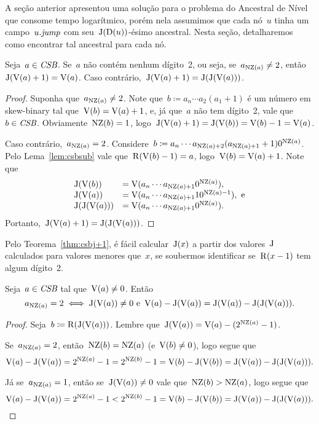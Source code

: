 \documentclass[main.tex]{subfiles}
\begin{document}
A seção anterior apresentou uma solução para o problema do Ancestral de Nível que consome tempo logarítmico, porém nela assumimos que cada nó~$u$ tinha um campo~$u.\jmp$ com seu~\mbox{$\J(\Dep(u))$-ésimo} ancestral. Nesta seção, detalharemos como encontrar tal ancestral para cada nó.

\begin{theorem} \label{thm:csbj+1}
	Seja~$a \in \CSB$. Se~$a$ não contém nenhum dígito~2, ou seja, se~$a_{\NZ(a)} \neq 2$, então~$\J(\V(a) + 1) = \V(a)$. Caso contrário,~$\J(\V(a) + 1) = \J(\J(\V(a)))$.
\end{theorem}
\begin{proof}
	Suponha que~$a_{\NZ(a)} \neq 2$. Note que~$b \coloneqq a_n \cdots a_2 (a_1 + 1)$ é um número em skew-binary tal que~${\V(b) = \V(a) + 1}$, e, já que~$a$ não tem dígito~2, vale que~${b \in \CSB}$. Obviamente~${\NZ(b) = 1}$, logo~${\J(\V(a) + 1) = \J(\V(b)) = \V(b) - 1 = \V(a)}$.

	Caso contrário,~${a_{\NZ(a)} = 2}$. Considere~${b \coloneqq a_n \cdots a_{\NZ(a) + 2} (a_{\NZ(a) + 1} + 1) 0^{\NZ(a)}}$. Pelo Lema~\ref{lem:csbsub} vale que~${\R(\V(b) - 1) = a}$, logo~${\V(b) = \V(a) + 1}$. Note que \vspace{-2ex}
	\[
	\begin{array}{ll}
		\J(\V(b))     &= \V(a_n \cdots a_{\NZ(a) + 1} 0^{\NZ(a)}), \\
		\J(\V(a))     &= \V(a_n \cdots a_{\NZ(a) + 1} 10^{\NZ(a)-1}),\text{ e} \\
		\J(\J(\V(a))) &= \V(a_n \cdots a_{\NZ(a) + 1} 0^{\NZ(a)}). \\
	\end{array}
	\]
	Portanto,~$\J(\V(a) + 1) = \J(\J(\V(a)))$.
\end{proof}

Pelo Teorema~\ref{thm:csbj+1}, é fácil calcular~$\J(x)$ a partir dos valores~$\J$ calculados para valores menores que~$x$, se soubermos identificar se~$\R(x - 1)$ tem algum dígito~2.

\begin{proposition} \label{prop:csbjj}
	Seja~$a \in \CSB$ tal que~$\V(a) \neq 0$. Então \vspace{-2ex}
	$${a_{\NZ(a)} = 2 \iff \J(\V(a)) \neq 0 \text{ e } \V(a) - \J(\V(a)) = \J(\V(a)) - \J(\J(\V(a))).}$$
\end{proposition}
\begin{proof}
	Seja~$b \coloneqq \R(\J(\V(a)))$. Lembre que~${\J(\V(a)) = \V(a) - (2^{\NZ(a)} - 1)}$.

	Se~$a_{\NZ(a)} = 2$, então~$\NZ(b) = \NZ(a)$ (e~$\V(b) \neq 0$), logo segue que~$$\V(a) - \J(\V(a)) = 2^{\NZ(a)} - 1 = 2^{\NZ(b)} - 1 = \V(b) - \J(\V(b)) = \J(\V(a)) - \J(\J(\V(a))).$$

	Já se~$a_{\NZ(a)} = 1$, então se~$\J(\V(a)) \neq 0$ vale que~$\NZ(b) > \NZ(a)$, logo segue que~$$\V(a) - \J(\V(a)) = 2^{\NZ(a)} - 1 < 2^{\NZ(b)} - 1 = \V(b) - \J(\V(b)) = \J(\V(a)) - \J(\J(\V(a))).$$
\end{proof}
\end{document}
